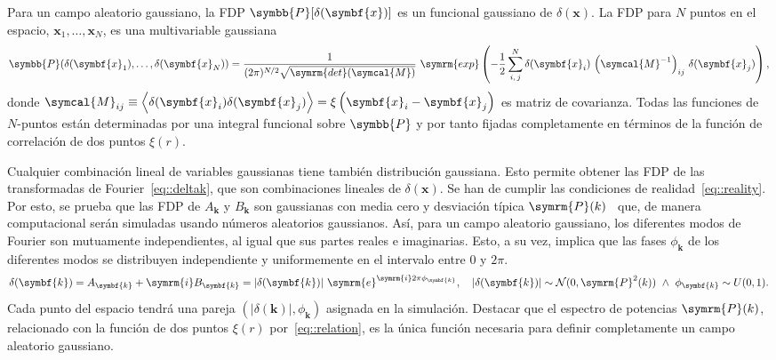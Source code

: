 Para un campo aleatorio gaussiano, la FDP \(\symbb{P}[\delta(\symbf{x})]\) es un funcional gaussiano de \(\delta(\symbf{x})\). La FDP para \(N\) puntos en el espacio, \(\symbf{x}_1,\ldots,\symbf{x}_N\), es una multivariable gaussiana
\begin{equation}
    \symbb{P}(\delta(\symbf{x}_1),\ldots,\delta(\symbf{x}_N))=\frac{1}{(2\pi)^{N/2}\sqrt{\symrm{det}(\symcal{M})}}\ \symrm{exp}\left(-\frac{1}{2}\sum^N_{i,\,j}\delta(\symbf{x}_i)\,\left(\symcal{M}^{-1}\right)_{ij}\,\delta(\symbf{x}_j)\right),
\end{equation}
donde \(\symcal{M}_{ij}\equiv\left\langle\delta(\symbf{x}_i)\delta(\symbf{x}_j)\right\rangle=\xi\left(\symbf{x}_i-\symbf{x}_j\right)\) es matriz de covarianza. Todas las funciones de \(N\)-puntos están determinadas por una integral funcional sobre \(\symbb{P}\) y por tanto fijadas completamente en términos de la función de correlación de dos puntos \(\xi(r)\).

Cualquier combinación lineal de variables gaussianas tiene también distribución gaussiana. Esto permite obtener las FDP de las transformadas de Fourier~\eqref{eq::deltak}, que son combinaciones lineales de \(\delta(\symbf{x})\). Se han de cumplir las condiciones de realidad~\eqref{eq::reality}. Por esto, se prueba que las FDP de \(A_{\symbf{k}}\) y \(B_{\symbf{k}}\) son gaussianas con media cero y desviación típica \(\symrm{P}(k)\)~\cite{mo_van} que, de manera computacional serán simuladas usando números aleatorios gaussianos. Así, para un campo aleatorio gaussiano, los diferentes modos de Fourier son mutuamente independientes, al igual que sus partes reales e imaginarias. Esto, a su vez, implica que las fases \(\phi_{\symbf{k}}\) de los diferentes modos se distribuyen independiente y uniformemente en el intervalo entre 0 y \(2\pi\).
\begin{equation}
    \delta(\symbf{k})=A_{\symbf{k}}+\symrm{i}B_{\symbf{k}}=\left|\delta(\symbf{k})\right|\,\symrm{e}^{\symrm{i}2\pi\phi_{\symbf{k}}},\quad \left|\delta(\symbf{k})\right|\sim\mathcal{N}(0,\symrm{P}^2(k))\ \wedge\ \phi_{\symbf{k}}\sim U(0,1).
\end{equation}
Cada punto del espacio tendrá una pareja \(\left(\left|\delta(\symbf{k})\right|,\phi_{\symbf{k}}\right)\) asignada en la simulación. Destacar que el espectro de potencias \(\symrm{P}(k)\), relacionado con la función de dos puntos \(\xi(r)\) por~\eqref{eq::relation}, es la única función necesaria para definir completamente un campo aleatorio gaussiano.

